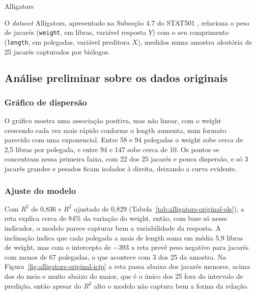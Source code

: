 \begin{dataset}{Alligators}

O \textit{dataset} Alligators, apresentado na Subseção 4.7 do STAT501 \cite{stat501}, relaciona o peso de jacarés (\texttt{weight}, em libras, variável resposta $Y$) com o seu comprimento (\texttt{length}, em polegadas, variável preditora $X$), medidos numa amostra aleatória de 25 jacarés capturados por biólogos.

\subsection{Análise preliminar sobre os dados originais}

\subsubsection{Gráfico de dispersão}


O gráfico mostra uma associação positiva, mas não linear, com o weight crescendo cada vez mais rápido conforme o length aumenta, num formato parecido com uma exponencial. Entre 58 e 94 polegadas o weight sobe cerca de 2,5 libras por polegada, e entre 94 e 147 sobe cerca de 10. Os pontos se concentram nessa primeira faixa, com 22 dos 25 jacarés e pouca dispersão, e só 3 jacarés grandes e pesados ficam isolados à direita, deixando a curva evidente.

\subsubsection{Ajuste do modelo}


Com $R^2$ de 0,836 e $R^2$ ajustado de 0,829 (Tabela~\ref{tab:alligators-original-ols}), a reta explica cerca de 84\% da variação do weight, então, com base só nesse indicador, o modelo parece capturar bem a variabilidade da resposta. A inclinação indica que cada polegada a mais de length soma em média 5,9 libras de weight, mas com o intercepto de $-393$ a reta prevê peso negativo para jacarés com menos de 67 polegadas, o que acontece com 3 dos 25 da amostra. Na Figura~\ref{fig:alligators-original-icip} a reta passa abaixo dos jacarés menores, acima dos do meio e muito abaixo do maior, que é o único dos 25 fora do intervalo de predição, então apesar do $R^2$ alto o modelo não captura bem a forma da relação.


\end{dataset}
